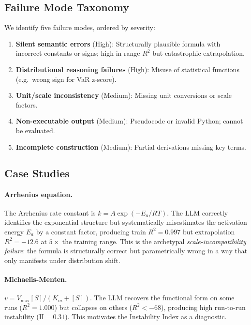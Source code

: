 \documentclass[twoside,11pt]{article}
\newcommand{\Rsq}{R^{2}}
\newcommand{\II}{\mathrm{II}}
\begin{document}
\subsection{Failure Mode Taxonomy}

We identify five failure modes, ordered by severity:
\begin{enumerate}
  \item \textbf{Silent semantic errors} (High): Structurally plausible formula with incorrect constants or signs; high in-range $\Rsq$ but catastrophic extrapolation.
  \item \textbf{Distributional reasoning failures} (High): Misuse of statistical functions (e.g.\ wrong sign for VaR z-score).
  \item \textbf{Unit/scale inconsistency} (Medium): Missing unit conversions or scale factors.
  \item \textbf{Non-executable output} (Medium): Pseudocode or invalid Python; cannot be evaluated.
  \item \textbf{Incomplete construction} (Medium): Partial derivations missing key terms.
\end{enumerate}

\subsection{Case Studies}

\paragraph{Arrhenius equation.}
The Arrhenius rate constant is $k = A \exp\!(-E_a/RT)$. The LLM correctly identifies the exponential structure but systematically misestimates the activation energy $E_a$ by a constant factor, producing train $\Rsq = 0.997$ but extrapolation $\Rsq = -12.6$ at $5\times$ the training range. This is the archetypal \emph{scale-incompatibility failure}: the formula is structurally correct but parametrically wrong in a way that only manifests under distribution shift.

\paragraph{Michaelis-Menten.}
$v = V_{\max}[S]/(K_m + [S])$. The LLM recovers the functional form on some runs ($\Rsq = 1.000$) but collapses on others ($\Rsq < -68$), producing high run-to-run instability ($\II = 0.31$). This motivates the Instability Index as a diagnostic.
\end{document}
